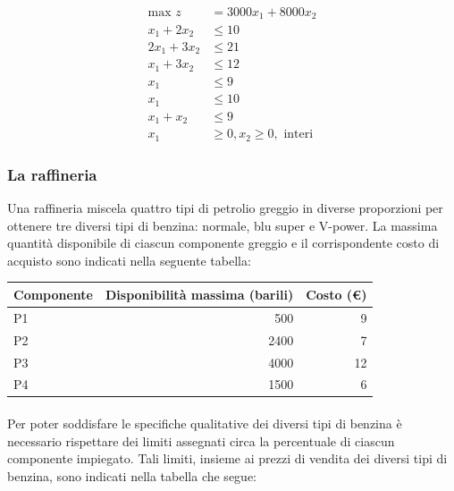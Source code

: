 \documentclass[a4paper, 11pt]{article}
\begin{document}
            \begin{align*}
                \text{max } z &= 3000x_1 + 8000x_2 \\
                x_1 + 2x_2 &\le 10 \\
                2x_1 + 3x_2 &\le 21 \\
                x_1 + 3x_2 &\le 12 \\
                x_1 &\le 9 \\
                x_1 &\le 10 \\
                x_1 + x_2 &\le 9 \\
                x_1 &\ge 0, x_2 \ge 0, \text{ interi}
            \end{align*}

            \subsubsection*{La raffineria}
            Una raffineria miscela quattro tipi di petrolio greggio in diverse proporzioni per ottenere tre diversi tipi di benzina: normale, blu super e V-power. La massima quantità disponibile di ciascun componente greggio e il corrispondente costo di acquisto sono indicati nella seguente tabella:

            \begin{table}[ht]
                \centering
                \begin{tabular}{|l|r|r|}
                \hline
                \textbf{Componente} & \textbf{Disponibilità massima (barili)} & \textbf{Costo (€)} \\ \hline
                P1                  & 500                                   & 9                  \\ 
                P2                  & 2400                                  & 7                  \\ 
                P3                  & 4000                                  & 12                 \\ 
                P4                  & 1500                                  & 6                  \\ \hline
                \end{tabular}
            \end{table}

            \paragraph{}
            Per poter soddisfare le specifiche qualitative dei diversi tipi di benzina è necessario rispettare dei limiti assegnati circa la percentuale di ciascun componente impiegato. Tali limiti, insieme ai prezzi di vendita dei diversi tipi di benzina, sono indicati nella tabella che segue:
\end{document}
